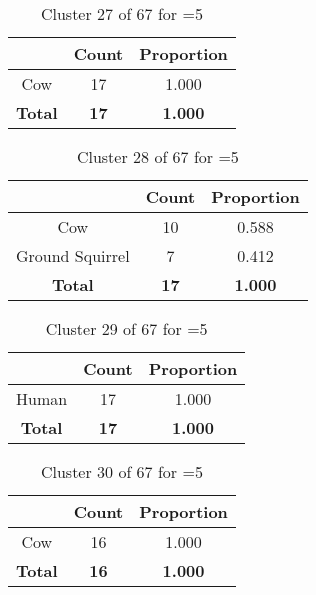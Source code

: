 \begin{table}[ht!]
\centering
\begin{tabular}{|c|c|c|}
\hline
\bf \Spec{} &\bf Count &\bf Proportion\\ \hline \hline
Cow & 17 & 1.000\\ \hline
\hline
\bf Total & \bf 17 & \bf 1.000\\ \hline
\end{tabular}
\label{tab:cluster:27:5}
\caption{Cluster 27 of 67 for \minneigh{}=5}
\end{table}

\begin{table}[ht!]
\centering
\begin{tabular}{|c|c|c|}
\hline
\bf \Spec{} &\bf Count &\bf Proportion\\ \hline \hline
Cow & 10 & 0.588\\ \hline
Ground Squirrel & 7 & 0.412\\ \hline
\hline
\bf Total & \bf 17 & \bf 1.000\\ \hline
\end{tabular}
\label{tab:cluster:28:5}
\caption{Cluster 28 of 67 for \minneigh{}=5}
\end{table}

\begin{table}[ht!]
\centering
\begin{tabular}{|c|c|c|}
\hline
\bf \Spec{} &\bf Count &\bf Proportion\\ \hline \hline
Human & 17 & 1.000\\ \hline
\hline
\bf Total & \bf 17 & \bf 1.000\\ \hline
\end{tabular}
\label{tab:cluster:29:5}
\caption{Cluster 29 of 67 for \minneigh{}=5}
\end{table}

\clearpage
\begin{table}[ht!]
\centering
\begin{tabular}{|c|c|c|}
\hline
\bf \Spec{} &\bf Count &\bf Proportion\\ \hline \hline
Cow & 16 & 1.000\\ \hline
\hline
\bf Total & \bf 16 & \bf 1.000\\ \hline
\end{tabular}
\label{tab:cluster:30:5}
\caption{Cluster 30 of 67 for \minneigh{}=5}
\end{table}


